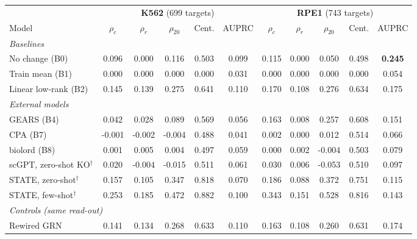 \begin{tabular}{lccccc@{\hspace{6pt}}ccccc}
\toprule
 & \multicolumn{5}{c}{\textbf{K562} (699 targets)} & \multicolumn{5}{c}{\textbf{RPE1} (743 targets)}\\
\cmidrule(lr){2-6}\cmidrule(lr){7-11}
Model & $\rho_c$ & $\rho_r$ & $\rho_{20}$ & Cent. & AUPRC & $\rho_c$ & $\rho_r$ & $\rho_{20}$ & Cent. & AUPRC\\\midrule
\multicolumn{11}{l}{\emph{Baselines}}\\
\hspace{0.4em}No change (B0) & 0.096 & 0.000 & 0.116 & 0.503 & 0.099 & 0.115 & 0.000 & 0.050 & 0.498 & \textbf{0.245}\\
\hspace{0.4em}Train mean (B1) & 0.000 & 0.000 & 0.000 & 0.000 & 0.031 & 0.000 & 0.000 & 0.000 & 0.000 & 0.054\\
\hspace{0.4em}Linear low-rank (B2) & 0.145 & 0.139 & 0.275 & 0.641 & 0.110 & 0.170 & 0.108 & 0.276 & 0.634 & 0.175\\
\midrule
\multicolumn{11}{l}{\emph{External models}}\\
\hspace{0.4em}GEARS (B4) & 0.042 & 0.028 & 0.089 & 0.569 & 0.056 & 0.163 & 0.008 & 0.257 & 0.608 & 0.151\\
\hspace{0.4em}CPA (B7) & -0.001 & -0.002 & -0.004 & 0.488 & 0.041 & 0.002 & 0.000 & 0.012 & 0.514 & 0.066\\
\hspace{0.4em}biolord (B8) & 0.001 & 0.005 & 0.004 & 0.497 & 0.059 & 0.000 & 0.002 & -0.004 & 0.503 & 0.079\\
\hspace{0.4em}scGPT, zero-shot KO$^\dagger$ & 0.020 & -0.004 & -0.015 & 0.511 & 0.061 & 0.030 & 0.006 & -0.053 & 0.510 & 0.097\\
\hspace{0.4em}STATE, zero-shot$^\dagger$ & 0.157 & 0.105 & 0.347 & 0.818 & 0.070 & 0.186 & 0.088 & 0.372 & 0.751 & 0.115\\
\hspace{0.4em}STATE, few-shot$^\dagger$ & 0.253 & 0.185 & 0.472 & 0.882 & 0.100 & 0.343 & 0.151 & 0.528 & 0.816 & 0.143\\
\midrule
\multicolumn{11}{l}{\emph{Controls (same read-out)}}\\
\hspace{0.4em}Rewired GRN & 0.141 & 0.134 & 0.268 & 0.633 & 0.110 & 0.163 & 0.108 & 0.260 & 0.631 & 0.174\\

\end{tabular}
